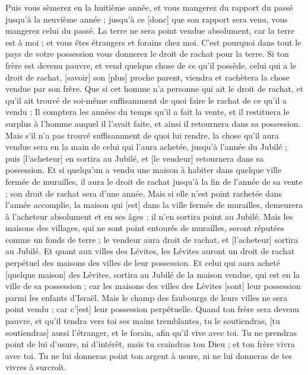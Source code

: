 \begin{multicols}{2}
Puis vous sèmerez en la huitième année, et vous mangerez du rapport du passé jusqu'à la neuvième année ; jusqu'à ce [donc] que son rapport sera venu, vous mangerez celui du passé.
La terre ne sera point vendue absolument, car la terre est à moi ; et vous êtes étrangers et forains chez moi.
C'est pourquoi dans tout le pays de votre possession vous donnerez le droit de rachat pour la terre.
Si ton frère est devenu pauvre, et vend quelque chose de ce qu'il possède, celui qui a le droit de rachat, [savoir] son [plus] proche parent, viendra et rachètera la chose vendue par son frère.
Que si cet homme n'a personne qui ait le droit de rachat, et qu'il ait trouvé de soi-même suffisamment de quoi faire le rachat de ce qu'il a vendu ;
Il comptera les années du temps qu'il a fait la vente, et il restituera le surplus à l'homme auquel il l'avait faite, et ainsi il retournera dans sa possession.
Mais s'il n'a pas trouvé suffisamment de quoi lui rendre, la chose qu'il aura vendue sera en la main de celui qui l'aura achetée, jusqu'à l'année du Jubilé ; puis [l'acheteur] en sortira au Jubilé, et [le vendeur] retournera dans sa possession.
Et si quelqu'un a vendu une maison à habiter dans quelque ville fermée de murailles, il aura le droit de rachat jusqu'à la fin de l'année de sa vente ; son droit de rachat sera d'une année.
Mais si elle n'est point rachetée dans l'année accomplie, la maison qui [est] dans la ville fermée de murailles, demeurera à l'acheteur absolument et en ses âges ; il n'en sortira point au Jubilé.
Mais les maisons des villages, qui ne sont point entourés de murailles, seront réputées comme un fonds de terre ; le vendeur aura droit de rachat, et [l'acheteur] sortira au Jubilé.
Et quant aux villes des Lévites, les Lévites auront un droit de rachat perpétuel des maisons des villes de leur possession.
Et celui qui aura acheté [quelque maison] des Lévites, sortira au Jubilé de la maison vendue, qui est en la ville de sa possession ; car les maisons des villes des Lévites [sont] leur possession parmi les enfants d'Israël.
Mais le champ des faubourgs de leurs villes ne sera point vendu ; car c'[est] leur possession perpétuelle.
Quand ton frère sera devenu pauvre, et qu'il tendra vers toi ses mains tremblantes, tu le soutiendras, [tu soutiendras] aussi l'étranger, et le forain, afin qu'il vive avec toi.
Tu ne prendras point de lui d'usure, ni d'intérêt, mais tu craindras ton Dieu ; et ton frère vivra avec toi.
Tu ne lui donneras point ton argent à usure, ni ne lui donneras de tes vivres à surcroît.

\end{multicols}
